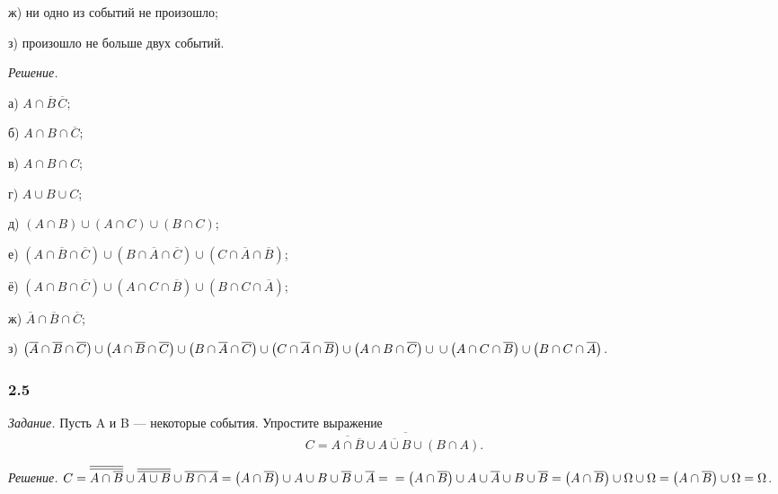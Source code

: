 \documentclass{book}
\begin{document}
ж) ни одно из событий не произошло;

з) произошло не больше двух событий.

\textit{Решение.}

а) $ A \cap \overline{ B } \, \overline{ C } $;

б) $ A \cap B \cap \overline{ C } $;

в) $ A \cap B \cap C $;

г) $ A \cup B \cup C $;

д) $ \left( A \cap B \right) \cup \left( A \cap C \right) \cup \left( B \cap C \right) $;

е) $ \left( A \cap \overline{ B } \cap \overline{ C } \right) \cup \left( B \cap \overline{ A } \cap \overline{ C } \right)
\cup \left( C \cap \overline{ A } \cap \overline{ B } \right) $;

ё) $ \left( A \cap B \cap \overline{ C } \right) \cup \left( A \cap C \cap \overline{ B } \right) \cup \left( B \cap C \cap \overline{ A } \right) $;

ж) $ \overline{ A } \cap \overline{ B } \cap \overline{ C } $;

з) $ \left( \overline{ A } \cap \overline{ B } \cap \overline{ C } \right) \cup
\left( A \cap \overline{ B } \cap \overline{ C } \right) \cup
\left( B \cap \overline{ A } \cap \overline{ C } \right) \cup
\left( C \cap \overline{ A } \cap \overline{ B } \right) \cup
\left( A \cap B \cap \overline{ C } \right) \cup \\
\cup \left( A \cap C \cap \overline{ B } \right) \cup
\left( B \cap C \cap \overline{ A } \right)$.

\subsubsection*{2.5}

\textit{Задание.} Пусть A и B --- некоторые события.
Упростите выражение
$$ C = \overline{ \overline{ A \cap \overline{ B } } \cup \overline{ A \cup B } \cup \left( B \cap A \right) }.$$

\textit{Решение.}
$ C =
\overline{ \overline{ A \cap \overline{ B }}} \cup \overline{ \overline{ A \cup B }} \cup \overline{ B \cap A } =
\left( A \cap \overline{ B } \right) \cup A \cup B \cup \overline{ B } \cup \overline{ A } = \\
= \left( A \cap \overline{ B } \right) \cup A \cup \overline{ A } \cup B \cup \overline{ B } =
\left( A \cap \overline{ B } \right) \cup \Omega \cup \Omega =
\left( A \cap \overline{ B } \right) \cup \Omega =
\Omega $.
\end{document}
